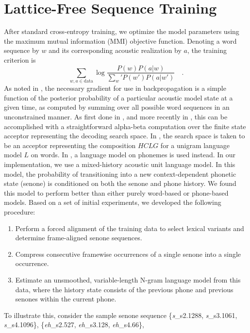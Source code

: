 \documentclass{article}
\begin{document}
\section{Lattice-Free Sequence Training}
\label{sec:lfmmi}
After standard cross-entropy training, we optimize the model parameters using
the maximum mutual information (MMI) objective function. Denoting a word sequence by $w$ and its 
corresponding acoustic realization by $a$, the training criterion is
\[
	\sum_{w,a \in \text{data}} \log \frac{P(w) P(a|w)} {\sum_w' P(w') P(a|w')}	\quad .
\]
As noted in \cite{sim2010sequential,vesely2013sequence},
the necessary gradient for use in backpropagation is a simple function 
of the posterior probability of a  particular acoustic model state at a given
time, as computed by summing over all possible word sequences in an 
unconstrained manner.  As first done in \cite{chen2006advances},  and more
recently in \cite{povey2016purely}, this can be accomplished with a 
straightforward alpha-beta computation over the finite state acceptor 
representing the decoding search space. In \cite{chen2006advances}, the 
search space is taken to be an acceptor representing the composition $HCLG$ for a 
unigram language model $L$ on words.
In \cite{povey2016purely}, a language model on phonemes is used instead.
In our implementation, we use a mixed-history acoustic unit language model.
In this model, the probability of transitioning into a new context-dependent phonetic state (senone)
is conditioned on both the senone and phone history.
We found this model to perform better than either purely word-based or phone-based models.
Based on a set of initial experiments, we developed the following procedure:
\begin{enumerate}
\item Perform a forced alignment of the training data to select 
lexical variants and determine frame-aligned senone sequences.
\item Compress consecutive framewise occurrences of a single senone into a single occurrence. 
\item Estimate an unsmoothed, variable-length N-gram language model from this data, where the history state consists of the previous phone and previous senones within the current phone.
\end{enumerate}
\newcommand{\phone}[1]{{\it #1}}
\newcommand{\state}[2]{{\it #1}\_s#2}
To illustrate this, consider the sample senone sequence
\{\state{s}{2.1288}, \state{s}{3.1061}, \state{s}{4.1096}\},
\{\state{eh}{2.527}, \state{eh}{3.128}, \state{eh}{4.66}\},
\end{document}
